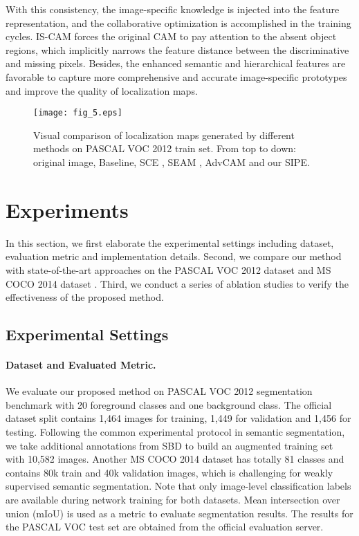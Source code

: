 \documentclass[10pt,twocolumn,letterpaper]{article}
\begin{document}
With this consistency, the image-specific knowledge is injected into the feature representation, and the collaborative optimization is accomplished in the training cycles.
IS-CAM forces the original CAM to pay attention to the absent object regions, which implicitly narrows the feature distance between the discriminative and missing pixels.
Besides, the enhanced semantic and hierarchical features are favorable to capture more comprehensive and accurate image-specific prototypes and improve the quality of localization maps.

\begin{figure*}[!t]
    \centering
    \texttt{[image: fig\_5.eps]}
    \caption{Visual comparison of localization maps generated by different methods on PASCAL VOC 2012 train set. From top to down: original image, Baseline, SCE \cite{chang2020weakly}, SEAM \cite{wang2020self}, AdvCAM \cite{lee2021anti} and our SIPE.}
    \label{fig:fig5}
\end{figure*}


\section{Experiments}
In this section, we first elaborate the experimental settings including dataset, evaluation metric and implementation details.
Second, we compare our method with state-of-the-art approaches on the PASCAL VOC 2012 dataset \cite{everingham2015pascal} and MS COCO 2014 dataset \cite{lin2014coco}.
Third, we conduct a series of ablation studies to verify the effectiveness of the proposed method.

\subsection{Experimental Settings}
\paragraph{Dataset and Evaluated Metric.}
We evaluate our proposed method on PASCAL VOC 2012 segmentation benchmark \cite{everingham2015pascal} with 20 foreground classes and one background class.
The official dataset split contains 1,464 images for training, 1,449 for validation and 1,456 for testing.
Following the common experimental protocol in semantic segmentation, we take additional annotations from SBD \cite{hariharan2011semantic} to build an augmented training set with 10,582 images.
Another MS COCO 2014 dataset has totally 81 classes and contains 80k train and 40k validation images, which is challenging for weakly supervised semantic segmentation.
Note that only image-level classification labels are available during network training for both datasets.
Mean intersection over union (mIoU) is used as a metric to evaluate segmentation results.
The results for the PASCAL VOC test set are obtained from the official evaluation server.
\end{document}
